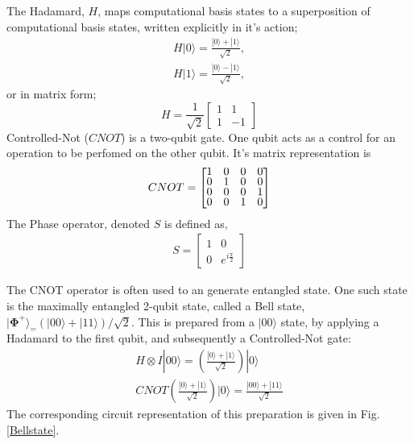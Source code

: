 The Hadamard, $H$, maps computational basis states to a superposition of computational basis states,
written explicitly in it's action;
\begin{align*}
    H |0\rangle = \frac{|0\rangle + |1\rangle}{\sqrt{2}}, \\
    H |1\rangle = \frac{|0\rangle - |1\rangle}{\sqrt{2}},
\end{align*}
or in matrix form;
\begin{equation*}
    H = \frac{1}{\sqrt{2}} \begin{bmatrix}
        1 & 1  \\
        1 & -1
    \end{bmatrix}
\end{equation*}
Controlled-Not ($CNOT$) is a two-qubit gate. One qubit acts as a control for an operation to be perfomed
on the other qubit. 
It's matrix representation is
\begin{align}
    \label{CNOT}
    CNOT =
    \renewcommand{\arraystretch}{0.75}
    \begin{bmatrix}
        1 & 0 & 0 & 0 \\
        0 & 1 & 0 & 0 \\
        0 & 0 & 0 & 1 \\
        0 & 0 & 1 & 0
    \end{bmatrix}
\end{align}
The Phase operator, denoted $S$ is defined as,
\begin{align*}
    S =
    \begin{bmatrix}
        1 & 0                  \\
        0 & e^{i\frac{\pi}{2}}
    \end{bmatrix}
\end{align*}

The CNOT operator is often used to an generate entangled state. One such state is the maximally entangled 2-qubit state,
called a Bell state, $|{\bm\Phi}^{+}\rangle_ = (|00\rangle + |11\rangle)/\sqrt{2}$. This is prepared
from a $|00\rangle$ state, by applying a Hadamard to the first qubit, and subsequently a Controlled-Not gate:
\begin{align}
    H \otimes I |00\rangle = \left (\frac{|0\rangle + |1\rangle }{\sqrt{2}}\right )|0\rangle \\
    CNOT \left (\frac{|0\rangle + |1\rangle }{\sqrt{2}}\right )|0\rangle = \frac{|00\rangle + |11\rangle}{\sqrt{2}}
\end{align}
The corresponding circuit representation of this preparation is given in Fig. \ref{Bellstate}.

